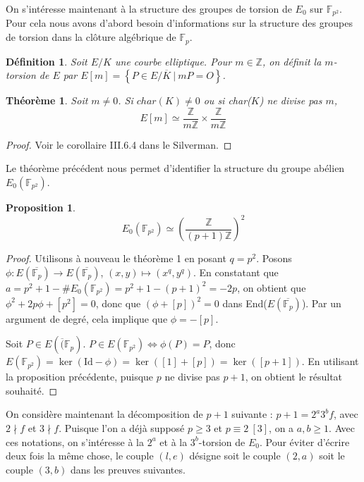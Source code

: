 \documentclass{article}
\newtheorem{thm}{Théorème}
\newtheorem{prop}{Proposition}
\newtheorem{deff}{Définition}
\newcommand{\Fp}{\mathbb{F}_{p}}
\newcommand{\Fq}{\mathbb{F}_{p^2}}
\newcommand{\F}{\mathbb{F}}
\newcommand{\Z}{\mathbb{Z}}
\begin{document}
On s'intéresse maintenant à la structure des groupes de torsion de $E_0$ sur $\F_{p^2}$. Pour cela nous avons d'abord besoin d'informations sur la structure des groupes de torsion dans la clôture algébrique de $\Fp$.
\begin{deff}
  Soit $E/K$ une courbe elliptique. Pour $m\in\Z$, on définit la $m$-torsion de $E$ par $ E[m] = \left\{ P\in E/\overline{K} \ \vert\  mP = O \right\}$.
\end{deff}

\begin{thm}
  Soit $m\neq0$. Si $char(K)\neq 0$ ou si char($K$) ne divise pas $m$, $$E[m] \simeq \frac{\Z}{m\Z} \times  \frac{\Z}{m\Z}$$
\end{thm}

\begin{proof}
  Voir le corollaire III.6.4 dans le Silverman.
\end{proof}

Le théorème précédent nous permet d'identifier la structure du groupe abélien $E_0(\Fq)$.

\begin{prop}
  $$E_0(\F_{p^2}) \simeq \left(  \frac{\Z}{(p+1)\Z} \right)^2$$
\end{prop}
\begin{proof}
  Utilisons à nouveau le théorème 1 en posant $q = p^2$. 
  Posons $\phi : E(\overline{\F_p}) \to E(\overline{\F_p})$, $\left( x, y \right) \mapsto \left( x^{q}, y^{q} \right)$.
  En constatant que $a=p^2 + 1 - \#E_0(\F_{p^2}) = p^2 + 1 - \left( p + 1 \right) ^2 = -2p$, on obtient que $\phi^2 + 2p\phi + [p^2] = 0$, donc que $\left( \phi + [p] \right) ^2 = 0$ dans End($E(\overline{\F_p})$). 
  Par un argument de degré, cela implique que $\phi = -[p]$. 

  Soit $P\in E(\overline(\F_{p})$. $P \in E(\F_{p^2}) \iff \phi(P) = P$, donc $E(\F_{p^2}) = \ker(\text{Id} - \phi) = \ker([1] + [p]) = \ker([p+1])$.
  En utilisant la proposition précédente, puisque $p$ ne divise pas $p+1$, on obtient le résultat souhaité.
\end{proof}

On considère maintenant la décomposition de $p + 1$ suivante : $p + 1 = 2^a 3^b f$, avec $2 \nmid f$ et $3 \nmid f$. Puisque l'on a déjà supposé $p\ge 3$ et $p \equiv 2\ [3]$, on a $a, b\ge 1$. Avec ces notations, on s'intéresse à la $2^a$ et à la $3^b$-torsion de $E_0$. Pour éviter d'écrire deux fois la même chose, le couple $\left( l, e \right)$ désigne soit le couple $(2, a)$ soit le couple $(3, b)$ dans les preuves suivantes. 
\end{document}
